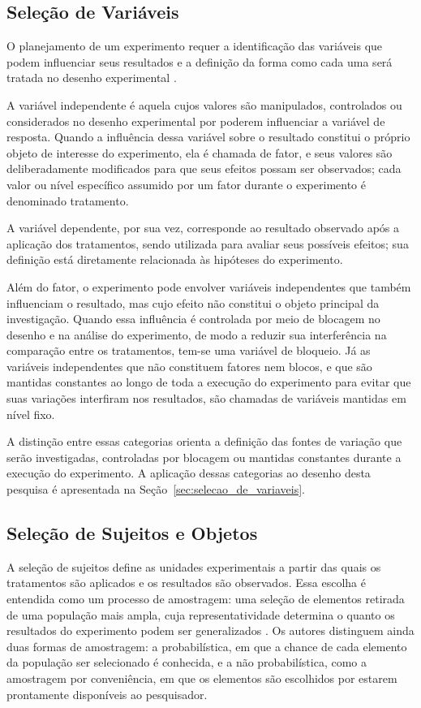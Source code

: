 \subsection{Seleção de Variáveis}

O planejamento de um experimento requer a identificação das variáveis que podem influenciar seus resultados e a definição da forma como cada uma será tratada no desenho experimental . 

A variável independente é aquela cujos valores são manipulados, controlados ou considerados no desenho experimental por poderem influenciar a variável de resposta. Quando a influência dessa variável sobre o resultado constitui o próprio objeto de interesse do experimento, ela é chamada de fator, e seus valores são deliberadamente modificados para que seus efeitos possam ser observados; cada valor ou nível específico assumido por um fator durante o experimento é denominado tratamento.

A variável dependente, por sua vez, corresponde ao resultado observado após a aplicação dos tratamentos, sendo utilizada para avaliar seus possíveis efeitos; sua definição está diretamente relacionada às hipóteses do experimento.

Além do fator, o experimento pode envolver variáveis independentes que também influenciam o resultado, mas cujo efeito não constitui o objeto principal da investigação. Quando essa influência é controlada por meio de blocagem no desenho e na análise do experimento, de modo a reduzir sua interferência na comparação entre os tratamentos, tem-se uma variável de bloqueio. Já as variáveis independentes que não constituem fatores nem blocos, e que são mantidas constantes ao longo de toda a execução do experimento para evitar que suas variações interfiram nos resultados, são chamadas de variáveis mantidas em nível fixo.

A distinção entre essas categorias orienta a definição das fontes de variação que serão investigadas, controladas por blocagem ou mantidas constantes durante a execução do experimento. A aplicação dessas categorias ao desenho desta pesquisa é apresentada na Seção~\ref{sec:selecao_de_variaveis}.

\subsection{Seleção de Sujeitos e Objetos}
\label{sec:selecao_sujeitos_ref}

A seleção de sujeitos define as unidades experimentais a partir das quais os tratamentos são aplicados e os resultados são observados. Essa escolha é entendida como um processo de amostragem: uma seleção de elementos retirada de uma população mais ampla, cuja representatividade determina o quanto os resultados do experimento podem ser generalizados . Os autores distinguem ainda duas formas de amostragem: a probabilística, em que a chance de cada elemento da população ser selecionado é conhecida, e a não probabilística, como a amostragem por conveniência, em que os elementos são escolhidos por estarem prontamente disponíveis ao pesquisador.

